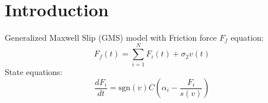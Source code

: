 \documentclass[10pt,a4paper]{article}
\begin{document}
 \\

\section{Introduction}
Generalized Maxwell Slip (GMS) model with
Friction force $F_f$ equation:
\begin{equation}
F_f(t) = \sum_{i=1}^N F_i(t) + \sigma_2v(t)
\end{equation}
State equations:
\begin{equation}
\frac{dF_i}{dt} = \text{sgn}(v)C \left( \alpha_i - \frac{F_i}{s(v)} \right)
\end{equation}



%

\end{document}
